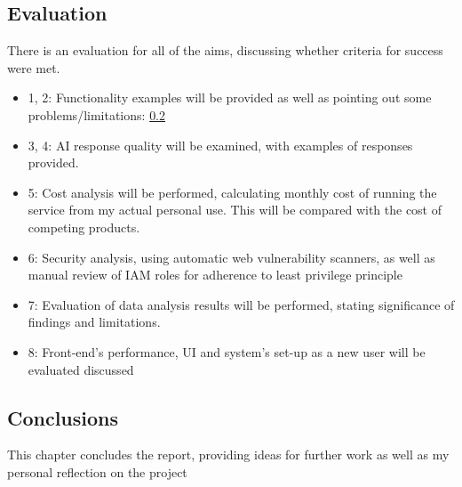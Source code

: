\subsection{Evaluation}
There is an evaluation for all of the aims, discussing whether criteria for success were met.
\begin{itemize}
    \item 1, 2: Functionality examples will be provided as well as pointing out some problems/limitations: \ref{}
    \item 3, 4: AI response quality will be examined, with examples of responses provided. 
    \item 5: Cost analysis will be performed, calculating monthly cost of running the service from my actual personal use. This will be compared with the cost of competing products.
    \item 6: Security analysis, using automatic web vulnerability scanners, as well as manual review of IAM roles for adherence to least privilege principle
    \item 7: Evaluation of data analysis results will be performed, stating significance of findings and limitations.
    \item 8: Front-end's performance, UI and system's set-up as a new user will be evaluated discussed
\end{itemize}
\subsection{Conclusions}
This chapter concludes the report, providing ideas for further work as well as my personal reflection on the project




